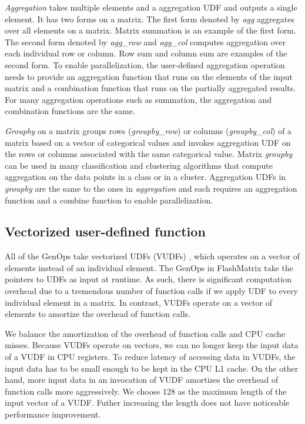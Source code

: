 \textit{Aggregation} takes multiple elements and a aggregation UDF and outputs
a single element. It has two forms on a matrix.
The first form denoted by \textit{agg} aggregates over all elements on a matrix.
Matrix summation is an example of the first form. The second form denoted by
\textit{agg\_row} and \textit{agg\_col} computes aggregation over each individual
row or column. Row sum and column sum are examples of the second form.
To enable parallelization, the user-defined aggregation operation needs to
provide an aggregation function that runs on the elements of the input matrix
and a combination function that runs on the partially aggregated
results. For many aggregation operations such as summation, the aggregation
and combination functions are the same.

\textit{Groupby} on a matrix groups rows (\textit{groupby\_row}) or columns
(\textit{groupby\_col}) of a matrix based on a vector of categorical values
and invokes aggregation UDF on the rows or
columns associated with the same categorical value. Matrix \textit{groupby}
can be used in many classification and clustering algorithms that compute
aggregation on the data points in a class or in a cluster. Aggregation UDFs
in \textit{groupby} are the same
to the ones in \textit{aggregation} and each requires an aggregation function
and a combine function to enable parallelization.

\subsection{Vectorized user-defined function}
All of the GenOps take vectorized UDFs (VUDFs) ,
which operates on a vector of elements instead of an individual element.
The GenOps in FlashMatrix take the pointers to UDFs as input at runtime.
As such, there is significant computation overhead due to a tremendous number
of function calls if we apply UDF to every individual element in a matrix.
In contrast, VUDFs operate on a vector of elements to amortize the overhead
of function calls.

We balance the amortization of the overhead of function calls and CPU cache
misses. Because VUDFs operate on vectors, we can no longer keep the input data
of a VUDF in CPU registers. To reduce latency of accessing data in VUDFs,
the input data has to be small enough to be kept in the CPU L1 cache. On the
other hand, more input data in an invocation of VUDF amortizes the overhead of
function calls more aggressively. We choose 128 as the maximum length of
the input vector of a VUDF.
Futher increasing the length does not have noticeable performance improvement.

